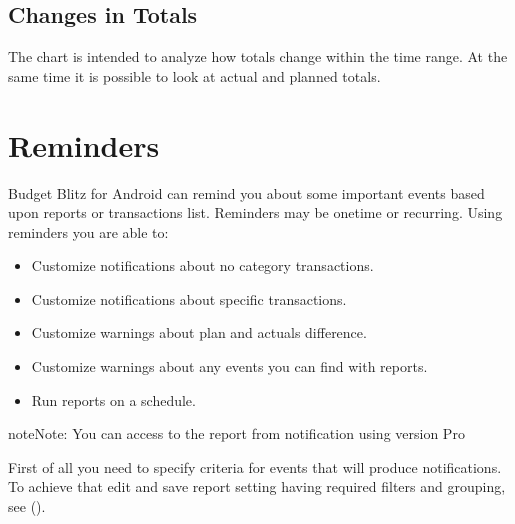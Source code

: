 \documentclass[a4paper,10pt,english]{sphinxmanual}
\begin{document}
\section{Changes in Totals}
\label{\detokenize{reports:changes-in-totals}}
\sphinxAtStartPar
The chart is intended to analyze how totals change within the time range. At the same time
it is possible to look at actual and planned totals.

\noindent{}

\sphinxstepscope


\chapter{Reminders}
\label{\detokenize{reminders:reminders}}\label{\detokenize{reminders:chapter-reminders}}\label{\detokenize{reminders::doc}}
\sphinxAtStartPar
Budget Blitz for Android can remind you about some important events based upon reports or transactions list. Reminders
may be one\sphinxhyphen{}time or recurring. Using reminders you are able to:
\begin{itemize}
\item {} 
\sphinxAtStartPar
Customize notifications about no category transactions.

\item {} 
\sphinxAtStartPar
Customize notifications about specific transactions.

\item {} 
\sphinxAtStartPar
Customize warnings about plan and actuals difference.

\item {} 
\sphinxAtStartPar
Customize warnings about any events you can find with reports.

\item {} 
\sphinxAtStartPar
Run reports on a schedule.

\end{itemize}

\begin{sphinxadmonition}{note}{Note:}
\sphinxAtStartPar
You can access to the report from notification using version Pro
\end{sphinxadmonition}

\sphinxAtStartPar
First of all you need to specify criteria for events that will produce notifications.
To achieve that edit and save report setting having required filters and grouping, see
{\hyperref[\detokenize{shortcuts:chapter-shortcuts}]{}} ().
\end{document}
